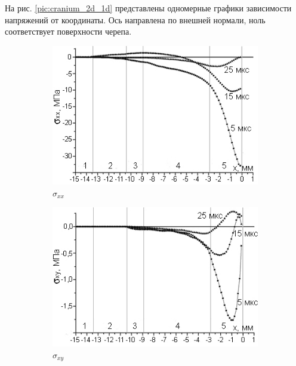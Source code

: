 На рис. \ref{pic:cranium_2d_1d} представлены одномерные графики зависимости напряжений от координаты. Ось направлена по внешней нормали, ноль соответствует поверхности черепа.

\begin{figure}[h]
\centering
\begin{subfigure}[b]{0.6\textwidth}
\centering
\includegraphics[width=\textwidth]{png/cranium/2d-sxx-1d.png}
\caption{$\sigma_{xx}$}
\end{subfigure}
\begin{subfigure}[b]{0.6\textwidth}
\centering
\includegraphics[width=\textwidth]{png/cranium/2d-sxy-1d.png}
\caption{$\sigma_{xy}$}
\end{subfigure}
\begin{subfigure}[b]{0.6\textwidth}
\centering

\end{subfigure}
\end{figure}

